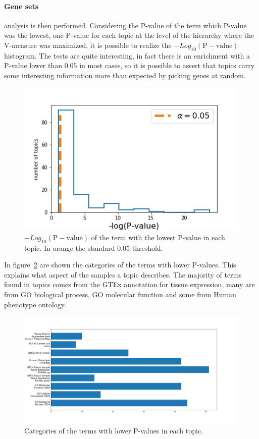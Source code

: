 \paragraph{Gene sets} analysis is then performed. Considering the P-value of the term which P-value was the lowest, one P-value for each topic at the level of the hierarchy where the V-measure was maximized, it is possible to realize the $-Log_{10}(\mathrm{P-value})$ histogram. The tests are quite interesting, in fact there is an enrichment with a P-value lower than $0.05$ in most cases, so it is possible to assert that topics carry some interesting information more than expected by picking genes at random.
\begin{figure}[htb!]
    \centering
    \includegraphics[width=0.5\linewidth]{pictures/topic/merged/pvaluescrosstopic.png}
    \caption{$-Log_{10}(\mathrm{P-value})$ of the term with the lowest P-value in each topic. In orange the standard $0.05$ threshold.}
    \label{fig:topic/merged/pvaluescrosstopic}
\end{figure}
In figure~\ref{fig:topic/merged/pvaluecategories} are shown the categories of the terms with lower P-values. This explains what aspect of the samples a topic describes. The majority of terms found in topics comes from the GTEx annotation for tissue expression, many are from GO biological process, GO molecular function and some from Human phenotype ontology. 
\begin{figure}[htb!]
    \centering
    \includegraphics[width=0.8\linewidth]{pictures/topic/merged/pvaluecategories.pdf}
    \caption{Categories of the terms with lower P-values in each topic.}
    \label{fig:topic/merged/pvaluecategories}
\end{figure}

